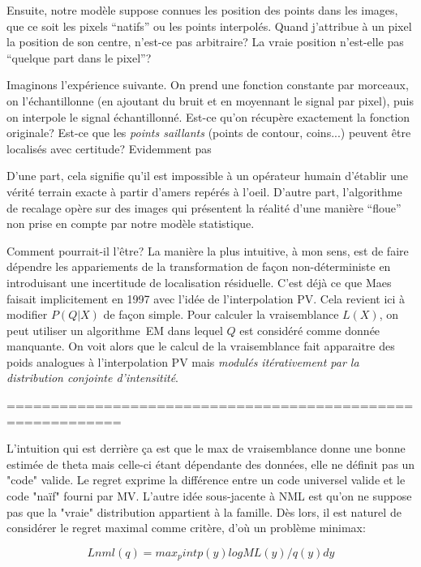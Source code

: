 \documentclass{article}
\begin{document}
Ensuite, notre mod\`ele suppose connues les position des points dans les images, que ce soit les pixels ``natifs'' ou les points interpol\'es. Quand j'attribue \`a un pixel la position de son centre, n'est-ce pas arbitraire? La vraie position n'est-elle pas ``quelque part dans le pixel''? 

Imaginons l'exp\'erience suivante. On prend une fonction constante par morceaux, on l'\'echantillonne (en ajoutant du bruit et en moyennant le signal par pixel), puis on interpole le signal \'echantillonn\'e. Est-ce qu'on r\'ecup\`ere exactement la fonction originale? Est-ce que les {\em points saillants} (points de contour, coins...) peuvent \^etre localis\'es avec certitude? Evidemment pas

D'une part, cela signifie qu'il est impossible \`a un op\'erateur humain d'\'etablir une v\'erit\'e terrain exacte \`a partir d'amers rep\'er\'es \`a l'oeil. D'autre part, l'algorithme de recalage op\`ere sur des images qui pr\'esentent la r\'ealit\'e d'une mani\`ere ``floue'' non prise en compte par notre mod\`ele statistique.

Comment pourrait-il l'\^etre? La mani\`ere la plus intuitive, \`a mon sens, est de faire d\'ependre les appariements de la transformation de fa\c con non-d\'eterministe en introduisant une incertitude de localisation r\'esiduelle. C'est d\'ej\`a ce que Maes faisait implicitement en 1997 avec l'id\'ee de l'interpolation PV. Cela revient ici \`a modifier $P(Q|X)$ de fa\c{c}on simple. Pour calculer la vraisemblance $L(X)$, on peut utiliser un algorithme~EM dans lequel $Q$ est consid\'er\'e comme donn\'ee manquante. On voit alors que le calcul de la vraisemblance fait apparaitre des poids analogues \`a l'interpolation PV mais {\em modul\'es it\'erativement par la distribution conjointe d'intensitit\'e}. 




=========================================================== 

L'intuition qui est derri\`ere \c{c}a est que le max de vraisemblance donne une bonne estim\'ee de theta mais celle-ci \'etant d\'ependante des donn\'ees, elle ne d\'efinit pas un "code" valide. Le regret exprime la diff\'erence entre un code universel valide et le code "na\"if" fourni par MV. L'autre id\'ee sous-jacente \`a NML est qu'on ne suppose pas que la "vraie" distribution appartient \`a la famille. D\`es lors, il est naturel de consid\'erer le regret maximal comme crit\`ere, d'o\`u un probl\`eme minimax: 

$$Lnml(q) = max_p int p(y) log ML(y)/q(y) dy$$ 
\end{document}
